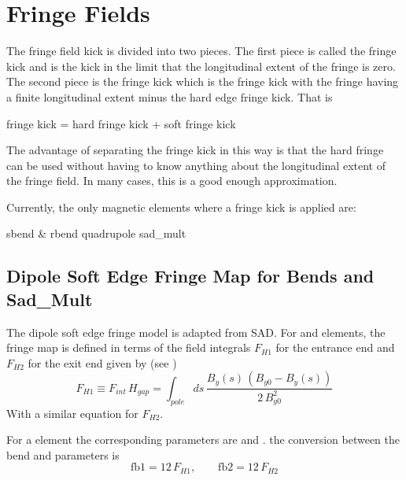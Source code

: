 \chapter{Fringe Fields}
\label{s:fringe.std}

The fringe field kick is divided into two pieces. 
The first piece is called the  fringe kick and is the kick in the limit
that the longitudinal extent of the fringe is zero. The second piece is the 
 fringe kick which is the fringe kick with the fringe having a finite
longitudinal extent minus the hard edge fringe kick. That is
\begin{example}
  fringe kick = hard fringe kick + soft fringe kick
\end{example}
The advantage of separating the fringe kick in this way is that the hard fringe can
be used without having to know anything about the longitudinal extent of the fringe
field. In many cases, this is a good enough approximation. 

Currently, the only magnetic elements where a fringe kick is applied are:
\begin{example}
  sbend \& rbend
  quadrupole
  sad_mult
\end{example}

\section{Dipole Soft Edge Fringe Map for Bends and Sad_Mult}
\label{s:fringe.bend.soft}

The dipole soft edge fringe model is adapted from SAD\cite{b:sad}. For  and 
elements, the fringe map is defined in terms of the field integrals $F_{H1}$ for the entrance end
and $F_{H2}$ for the exit end given by (see )
\begin{equation}
  F_{H1} \equiv F_{int} \, H_{gap} = \int_{pole} \! \! ds \, \frac{B_y(s) \, (B_{y0} - B_y(s))}
  {2 \, B_{y0}^2}
\end{equation}
With a similar equation for $F_{H2}$.  

For a  element the corresponding parameters are  and . the conversion between
the bend and  parameters is
\begin{equation}
  \text{fb1} = 12 \, F_{H1}, \qquad \text{fb2} = 12 \, F_{H2}
\end{equation}

